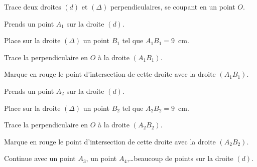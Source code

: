 \begin{myenumerate}
\item Trace deux droites $(d)$ et $(\Delta)$ perpendiculaires, se
  coupant en un point $O$.
\item Prends un point $A_1$ sur la droite $(d)$.
\item Place sur la droite $(\Delta)$ un point $B_1$ tel que
  $A_1B_1=9$~cm.
\item Trace la perpendiculaire en $O$ à la droite $(A_1B_1)$.
\item Marque en rouge le point d'intersection de cette droite
  avec la droite $(A_1B_1)$.
\item Prends un point $A_2$ sur la droite $(d)$.
\item Place sur la droite $(\Delta)$ un point $B_2$ tel que $A_2B_2=9$~cm.
\item Trace la perpendiculaire en $O$ à la droite $(A_2B_2)$.
\item Marque en rouge le point d'intersection de cette droite
  avec la droite $(A_2B_2)$.
\end{myenumerate}
Continue avec un point $A_3$, un point $A_4$,\ldots beaucoup de points sur la droite $(d)$.
